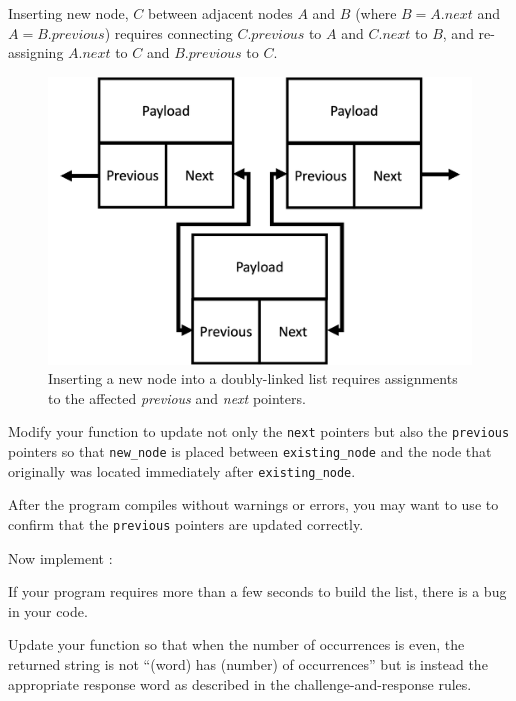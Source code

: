 Inserting new node, $C$ between adjacent nodes $A$ and $B$ (where $B = A.next$ and $A = B.previous$) requires connecting $C.previous$ to $A$ and $C.next$ to $B$, and re-assigning $A.next$ to $C$ and $B.previous$ to $C$.

\begin{figure}[h]
    \centering
    \includegraphics[scale=0.5]{dll-insertion}
    \caption{Inserting a new node into a doubly-linked list requires assignments to the affected \textit{previous} and \textit{next} pointers.}
\end{figure}

Modify your  function to update not only the \lstinline{next} pointers but also the \lstinline{previous} pointers so that \lstinline{new_node} is placed between \lstinline{existing_node} and the node that originally was located immediately after \lstinline{existing_node}.

After the program compiles without warnings or errors, you may want to use  to confirm that the \lstinline{previous} pointers are updated correctly.

Now implement :



If your program requires more than a few seconds to build the list, there is a bug in your code.

Update your  function so that when the number of occurrences is even, the returned string is not ``(word) has (number) of occurrences'' but is instead the appropriate response word as described in the challenge-and-response rules.

